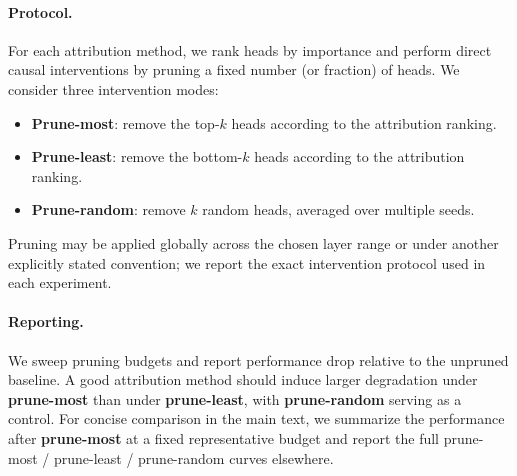 \paragraph{Protocol.}
For each attribution method, we rank heads by importance and perform direct causal interventions by pruning a fixed number (or fraction) of heads. We consider three intervention modes:
\begin{itemize}
    \item \textbf{Prune-most}: remove the top-$k$ heads according to the attribution ranking.
    \item \textbf{Prune-least}: remove the bottom-$k$ heads according to the attribution ranking.
    \item \textbf{Prune-random}: remove $k$ random heads, averaged over multiple seeds.
\end{itemize}
Pruning may be applied globally across the chosen layer range or under another explicitly stated convention; we report the exact intervention protocol used in each experiment.

\paragraph{Reporting.}
We sweep pruning budgets and report performance drop relative to the unpruned baseline. A good attribution method should induce larger degradation under \textbf{prune-most} than under \textbf{prune-least}, with \textbf{prune-random} serving as a control. For concise comparison in the main text, we summarize the performance after \textbf{prune-most} at a fixed representative budget and report the full prune-most / prune-least / prune-random curves elsewhere.

